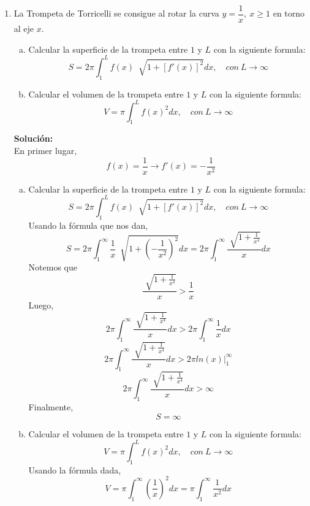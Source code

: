 \documentclass[12pt]{article}
\newenvironment{solucion}
{\begin{mdframed}[backgroundcolor=black!10]
		{\bf Solución:}\\
	}
	{
	\end{mdframed}
}
\newenvironment{preguntas}
{\begin{enumerate}\itemsep12pt
	}
	{
	\end{enumerate}
}
\newcommand{\ev}{\Big|}
\newcommand{\ra}{\rightarrow}
\begin{document}
\begin{preguntas}
\begin{solucion}
\begin{enumerate}[a)]
			$$= \lim\limits_{a\ra 0} 2arctan(\sqrt[]{x}) \ev_a^1 + \lim\limits_{a\ra \infty} 2arctan(\sqrt[]{x}) \ev_1^a$$
			$$= \lim\limits_{a\ra 0} 2(arctan(1) -arctan(\sqrt[]{a}))  + \lim\limits_{a\ra \infty} 2(arctan(\sqrt[]{a}) - arctan(1)) \ev_1^a$$
			$$= 2\left(\dfrac{\pi}{4} - 0\right) + 2\left(\dfrac{\pi}{2} - \dfrac{\pi}{4}\right)$$
			$$= \pi$$
			Por lo que la integral converge a $\pi$.
\end{enumerate}
\end{solucion}
\item La Trompeta de Torricelli se consigue al rotar la curva $y=\dfrac{1}{x},\ x \geq 1$ en torno al eje $x$.
\begin{enumerate}[a)]
\item Calcular la superficie de la trompeta entre $1$ y $L$ con la siguiente formula:
		$$ S = 2\pi \displaystyle\int_{1}^{L} f(x)\ \sqrt[]{1+[f'(x)]^2}dx, \quad con\ L \ra \infty $$
\item Calcular el volumen de la trompeta entre $1$ y $L$ con la siguiente formula:
		$$ V = \pi \displaystyle\int_{1}^{L} f(x)^2dx, \quad con\ L \ra \infty$$
\end{enumerate}
\begin{solucion}
En primer lugar,
			$$f(x) = \dfrac{1}{x} \ra f'(x) = -\dfrac{1}{x^2}$$
\begin{enumerate}[a)]
\item Calcular la superficie de la trompeta entre $1$ y $L$ con la siguiente formula:
			$$ S = 2\pi \displaystyle\int_{1}^{L} f(x)\ \sqrt[]{1+[f'(x)]^2}dx, \quad con\ L \ra \infty$$
			Usando la fórmula que nos dan,
			$$S = 2\pi \displaystyle\int_{1}^{\infty} \dfrac{1}{x}\ \sqrt[]{1+\left(-\dfrac{1}{x^2}\right)^2}dx 
			= 2\pi \displaystyle\int_{1}^{\infty} \dfrac{\sqrt[]{1+\frac{1}{x^4}}}{x}dx$$
			Notemos que
			$$\dfrac{\sqrt[]{1+\frac{1}{x^4}}}{x} > \dfrac{1}{x}$$
			Luego,
			$$2\pi \displaystyle\int_{1}^{\infty} \dfrac{\sqrt[]{1+\frac{1}{x^4}}}{x}dx
			>  2\pi \displaystyle\int_{1}^{\infty} \dfrac{1}{x}dx$$
			$$2\pi \displaystyle\int_{1}^{\infty} \dfrac{\sqrt[]{1+\frac{1}{x^4}}}{x}dx
			>  2\pi ln(x) \ev_1^{\infty}$$
			$$2\pi \displaystyle\int_{1}^{\infty} \dfrac{\sqrt[]{1+\frac{1}{x^4}}}{x}dx
			>  \infty$$
			Finalmente,
			$$S = \infty$$
\item Calcular el volumen de la trompeta entre $1$ y $L$ con la siguiente formula:
			$$ V = \pi \displaystyle\int_{1}^{L} f(x)^2dx, \quad con\ L \ra \infty$$
			Usando la fórmula dada,
			$$V = \pi \displaystyle\int_{1}^{\infty} \left(\dfrac{1}{x}\right)^2dx
			=  \pi \displaystyle\int_{1}^{\infty} \dfrac{1}{x^2}dx
$$
\end{enumerate}
\end{solucion}
\end{preguntas}
\end{document}

